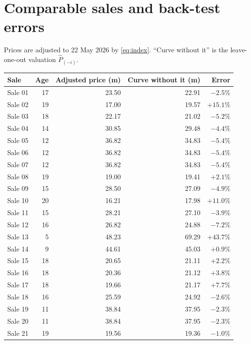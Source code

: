 \documentclass[11pt,a4paper]{article}
\newcommand{\usd}[1]{\text{US\$}#1}
\begin{document}
\nocite{Stopford2009,Tsolakis2003}

\appendix
\section{Comparable sales and back-test errors}
\label{app:data}

Prices are adjusted to 22 May 2026 by \eqref{eq:index}. ``Curve without it'' is the leave-one-out valuation $\hat P_{(-i)}$.

\begin{center}
\small
\begin{longtable}{@{}l r r r r@{}}
\toprule
Sale & Age & Adjusted price (\usd{}m) & Curve without it (\usd{}m) & Error \\
\midrule
\endhead
Sale 01 & 17 & 23.50 & 22.91 & $-2.5\%$ \\
Sale 02 & 19 & 17.00 & 19.57 & $+15.1\%$ \\
Sale 03 & 18 & 22.17 & 21.02 & $-5.2\%$ \\
Sale 04 & 14 & 30.85 & 29.48 & $-4.4\%$ \\
Sale 05 & 12 & 36.82 & 34.83 & $-5.4\%$ \\
Sale 06 & 12 & 36.82 & 34.83 & $-5.4\%$ \\
Sale 07 & 12 & 36.82 & 34.83 & $-5.4\%$ \\
Sale 08 & 19 & 19.00 & 19.41 & $+2.1\%$ \\
Sale 09 & 15 & 28.50 & 27.09 & $-4.9\%$ \\
Sale 10 & 20 & 16.21 & 17.98 & $+11.0\%$ \\
Sale 11 & 15 & 28.21 & 27.10 & $-3.9\%$ \\
Sale 12 & 16 & 26.82 & 24.88 & $-7.2\%$ \\
Sale 13 & 5 & 48.23 & 69.29 & $+43.7\%$ \\
Sale 14 & 9 & 44.61 & 45.03 & $+0.9\%$ \\
Sale 15 & 18 & 20.65 & 21.11 & $+2.2\%$ \\
Sale 16 & 18 & 20.36 & 21.12 & $+3.8\%$ \\
Sale 17 & 18 & 19.66 & 21.17 & $+7.7\%$ \\
Sale 18 & 16 & 25.59 & 24.92 & $-2.6\%$ \\
Sale 19 & 11 & 38.84 & 37.95 & $-2.3\%$ \\
Sale 20 & 11 & 38.84 & 37.95 & $-2.3\%$ \\
Sale 21 & 19 & 19.56 & 19.36 & $-1.0\%$ \\

\end{longtable}
\end{center}
\end{document}
